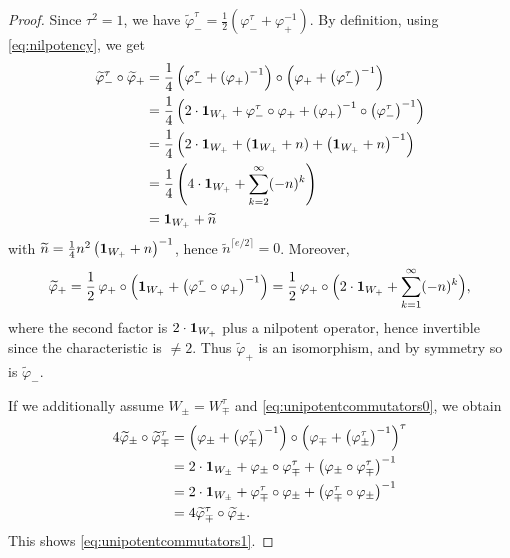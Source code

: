 \documentclass[a4paper,12pt,reqno]{amsart}
\theoremstyle{plain}
\theoremstyle{remark}
\begin{document}
    \begin{proof}
      Since $\tau^2=1$, we have $\widetilde{\varphi}_-^\tau=\frac{1}{2}\left(\varphi_-^\tau+\varphi_+^{-1}\right)$. By definition, using \eqref{eq:nilpotency}, we get
      \begin{align*}
        \widetilde{\varphi}_-^\tau\circ\widetilde{\varphi}_+ &=
        \frac{1}{4}\left(\varphi_-^\tau+\left(\varphi_+\right)^{-1}\right)
        \circ \left(\varphi_++\left(\varphi_-^\tau\right)^{-1}\right)\\
        &=
        \frac{1}{4}\left(2\cdot{\bf1}_{W_+}+\varphi_-^\tau\circ\varphi_++\left(\varphi_+\right)^{-1}\circ\left(\varphi_-^\tau\right)^{-1}\right)\\
        &=
        \frac{1}{4}\left(2\cdot{\bf1}_{W_+}+({\bf1}_{W_+}+n)+\left({\bf1}_{W_+}+n\right)^{-1}\right)\\
        &=
        \frac{1}{4}\left(4\cdot{\bf1}_{W_+}+\sum_{k=2}^\infty(-n)^k\right)\\
        &=
        {\bf1}_{W_+}+\widetilde{n}
      \end{align*}
      with $\widetilde{n}=\frac{1}{4}n^2\left({\bf1}_{W_+}+n\right)^{-1}$, hence $\widetilde{n}^{\lceil e/2 \rceil}=0$. Moreover,
      \[
        \widetilde{\varphi}_+=\frac{1}{2}\,\varphi_+\circ\left({\bf1}_{W_+}+\left(\varphi_-^\tau\circ\varphi_+\right)^{-1}\right)
        =\frac{1}{2}\,\varphi_+\circ\Big(2\cdot{\bf1}_{W_+}+\sum_{k=1}^\infty(-n)^k\Big),
      \]
      where the second factor is $2\cdot{\bf1}_{W_+}$ plus a nilpotent operator, hence invertible since the characteristic is $\neq2$. Thus $\widetilde{\varphi}_+$ is an isomorphism, and by symmetry so is $\widetilde{\varphi}_-$.

      If we additionally assume $W_\pm = W_\mp^\tau$ and \eqref{eq:unipotentcommutators0}, we obtain
      \begin{align*}
        4\widetilde{\varphi}_\pm\circ\widetilde{\varphi}_\mp^\tau
        &=\left(\varphi_\pm+\left(\varphi_\mp^\tau\right)^{-1}\right)\circ \left(\varphi_\mp+\left(\varphi_\pm^\tau\right)^{-1}\right)^\tau\\
        &=2\cdot{\bf1}_{W_\pm}+\varphi_\pm\circ\varphi_\mp^\tau+\left(\varphi_\pm\circ\varphi_\mp^\tau\right)^{-1}\\
        &=2\cdot{\bf1}_{W_\pm}+\varphi_\mp^\tau\circ\varphi_\pm+\left(\varphi_\mp^\tau\circ\varphi_\pm\right)^{-1}\\
        &=4\widetilde{\varphi}_\mp^\tau\circ\widetilde{\varphi}_\pm.
      \end{align*}
      This shows \eqref{eq:unipotentcommutators1}.


\end{proof}
\end{document}

